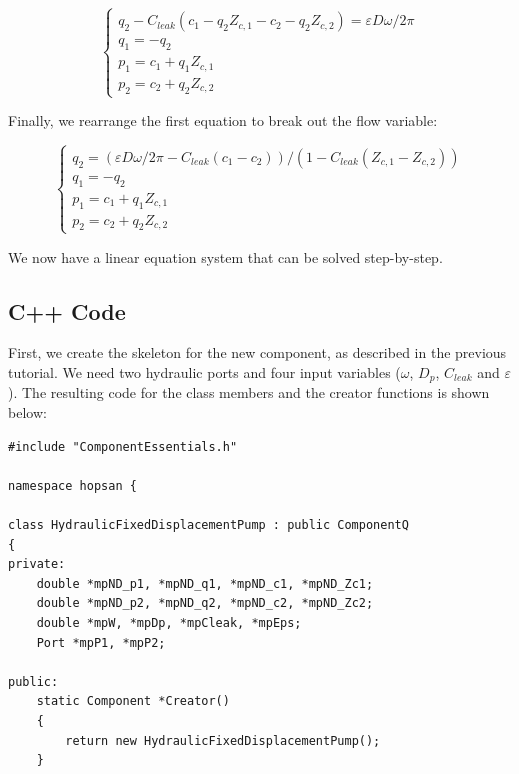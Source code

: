 \documentclass[a4paper,pdftex]{article}
\begin{document}
\begin{equation*}
\begin{cases}
q_{2} - C_{leak}(c_{1} - q_{2}Z_{c,1}-c_{2} - q_{2}Z_{c,2}) = \varepsilon D \omega/2\pi \\
q_{1} = -q_{2}\\
p_{1} = c_{1} + q_{1}Z_{c,1}\\
p_{2} = c_{2} + q_{2}Z_{c,2}
\end{cases}
\end{equation*}

\noindent Finally, we rearrange the first equation to break out the flow variable:

\begin{equation*}
\begin{cases}
q_{2} = (\varepsilon D \omega/2\pi - C_{leak}(c_{1} -c_{2})) / (1-C_{leak}(Z_{c,1}-Z_{c,2}))\\
q_{1} = -q_{2}\\
p_{1} = c_{1} + q_{1}Z_{c,1}\\
p_{2} = c_{2} + q_{2}Z_{c,2}
\end{cases}
\end{equation*}

\noindent We now have a linear equation system that can be solved step-by-step. 

\subsection*{C++ Code}
First, we create the skeleton for the new component, as described in the previous tutorial. We need two hydraulic ports and four input variables ($\omega$, $D_{p}$, $C_{leak}$ and $\varepsilon$). The resulting code for the class members and the creator functions is shown below:

\noindent 
\begin{minipage}{\linewidth}
\begin{lstlisting}[basicstyle=\footnotesize\ttfamily]
#include "ComponentEssentials.h"

namespace hopsan {

class HydraulicFixedDisplacementPump : public ComponentQ
{
private:
    double *mpND_p1, *mpND_q1, *mpND_c1, *mpND_Zc1; 
    double *mpND_p2, *mpND_q2, *mpND_c2, *mpND_Zc2;
    double *mpW, *mpDp, *mpCleak, *mpEps;
    Port *mpP1, *mpP2;

public:
    static Component *Creator()
    {
        return new HydraulicFixedDisplacementPump();
    }
\end{lstlisting}
\end{minipage}
\end{document}
